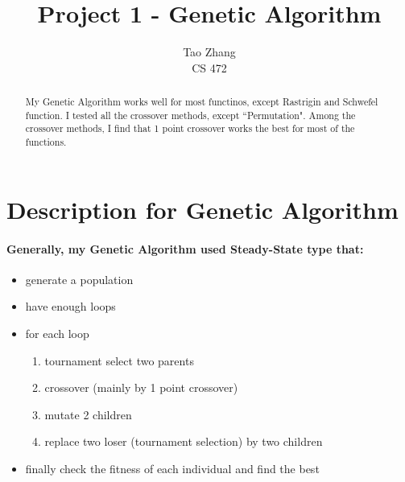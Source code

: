 \documentclass[12pt]{article}
\begin{document}
\title{Project 1 - Genetic Algorithm}

\author{Tao Zhang\\
CS 472}

\maketitle
\newpage


\begin{abstract}
My Genetic Algorithm works well for most functinos, except Rastrigin and Schwefel function. I tested all the crossover methods, except ``Permutation". Among the crossover methods, I find that 1 point crossover works the best for most of the functions. 
\end{abstract}

\section{Description for Genetic Algorithm}
\paragraph{Generally, my Genetic Algorithm used Steady-State type that: } 
\begin{itemize}
	\item generate a population
	\item have enough loops
	\item for each loop 
	\begin{enumerate}
		\item tournament select two parents
		\item crossover (mainly by 1 point crossover)
		\item mutate 2 children
		\item replace two loser (tournament selection) by two children
	\end{enumerate}
	\item finally check the fitness of each individual and find the best
\end{itemize}
\end{document}

